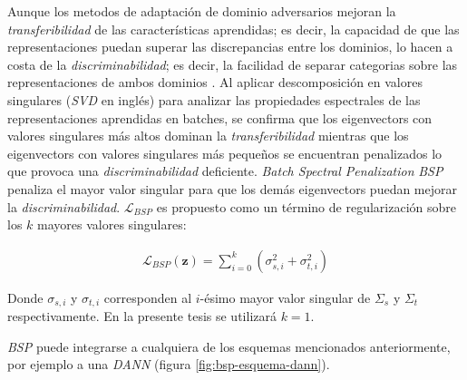 Aunque los metodos de adaptaci\'on de dominio adversarios mejoran la {\it transferibilidad} de las características
aprendidas; es decir, la capacidad de que las representaciones puedan superar las discrepancias entre los dominios, lo
hacen a costa de la {\it discriminabilidad}; es decir, la facilidad de separar categorias sobre las representaciones de
ambos dominios \parencite{chen2019transferability}. Al aplicar descomposici\'on en valores singulares ({\it SVD} en ingl\'es) para
analizar las propiedades espectrales de las representaciones aprendidas en batches, se confirma que los eigenvectors
con valores singulares m\'as altos dominan la {\it transferibilidad} mientras que los eigenvectors con valores
singulares m\'as pequeños se encuentran penalizados lo que provoca una {\it discriminabilidad} deficiente. {\it Batch
        Spectral Penalization} {\it BSP} \parencite{chen2019transferability} penaliza el mayor valor singular para que los dem\'as eigenvectors puedan mejorar la
    {\it discriminabilidad}. $\mathcal{L}_{BSP}$ es propuesto como un t\'ermino de regularizaci\'on sobre los $k$ mayores
valores singulares:

\begin{align}
    \mathcal{L}_{BSP}(\mathbf{z}) = \sum_{i=0}^{k} (\sigma_{s, i}^2 + \sigma_{t, i}^2)
    \label{eq:bsp}
\end{align}

Donde $\sigma_{s, i}$ y $\sigma_{t, i}$ corresponden al $i$-\'esimo mayor valor singular de $\Sigma_s$ y $\Sigma_t$
respectivamente. En la presente tesis se utilizar\'a $k=1$.

    {\it BSP} puede integrarse a cualquiera de los esquemas mencionados anteriormente, por ejemplo a una {\it DANN} (figura \ref{fig:bsp-esquema-dann}).

